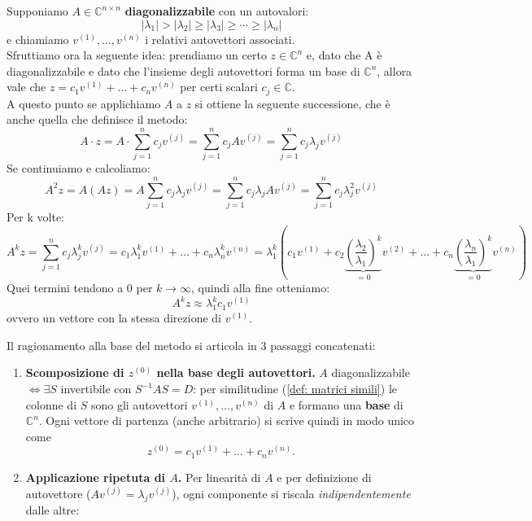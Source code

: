 \documentclass[12pt,a4paper,]{report}
\begin{document}
\begin{metodo}
Supponiamo $A\in \mathbb{C}^{n\times n}$ \textbf{diagonalizzabile} con un autovalori:
\[
|\lambda_1| > |\lambda_2| \geq |\lambda_3| \geq \cdots \geq |\lambda_n|
\]
e chiamiamo $v^{(1)}, \dots, v^{(n)}$ i relativi autovettori associati.\\
Sfruttiamo ora la seguente idea: prendiamo un certo $z\in\mathbb{C}^n$ e, dato che A è diagonalizzabile e dato che l'insieme degli autovettori forma un base di $\mathbb{C}^n$, allora vale che $z = c_1v^{(1)}+\dots+c_nv^{(n)}$ per certi scalari $c_j\in\mathbb{C}$.\\
A questo punto se applichiamo $A$ a $z$ si ottiene la seguente successione, che è anche quella che definisce il metodo:
\[
A \cdot z = A \cdot \sum_{j=1}^{n} c_j v^{(j)} = \sum_{j=1}^{n} c_j A v^{(j)} = \sum_{j=1}^{n} c_j \lambda_j v^{(j)}
\]
Se continuiamo e calcoliamo:
\[
A^2 z = A(Az) = A \sum_{j=1}^{n} c_j \lambda_j v^{(j)} = \sum_{j=1}^{n} c_j \lambda_j A v^{(j)} = \sum_{j=1}^{n} c_j \lambda_j^2 v^{(j)}
\]
Per k volte:
\[
A^k z = \sum_{j=1}^{n} c_j \lambda_j^k v^{(j)} = c_1 \lambda_1^k v^{(1)} + \ldots + c_n \lambda_n^k v^{(n)} = \lambda_1^k \left( c_1 v^{(1)} + c_2 \underbrace{\left(\frac{\lambda_2}{\lambda_1}\right)^k}_{=0} v^{(2)} + \ldots + c_n \underbrace{\left(\frac{\lambda_n}{\lambda_1}\right)^k}_{=0} v^{(n)} \right)
\]
Quei termini tendono a 0 per $k \to \infty$, quindi alla fine otteniamo:
\[
\boxed{A^k z \approx \lambda_1^k c_1 v^{(1)}}
\]
ovvero un vettore con la stessa direzione di $v^{(1)}$.
\begin{nota}
    Il ragionamento alla base del metodo si articola in 3 passaggi concatenati:
    \begin{enumerate}
        \item \textbf{Scomposizione di $z^{(0)}$ nella base degli autovettori.} $A$ diagonalizzabile $\iff \exists S$ invertibile con $S^{-1}AS=D$: per similitudine (\autoref{def: matrici simili}) le colonne di $S$ sono gli autovettori $v^{(1)},\dots,v^{(n)}$ di $A$ e formano una \textbf{base} di $\mathbb{C}^n$. Ogni vettore di partenza (anche arbitrario) si scrive quindi in modo unico come
        \[
        z^{(0)} = c_1v^{(1)}+\dots+c_nv^{(n)}.
        \]
        \item \textbf{Applicazione ripetuta di $A$.} Per linearità di $A$ e per definizione di autovettore ($Av^{(j)}=\lambda_jv^{(j)}$), ogni componente si riscala \textit{indipendentemente} dalle altre:
        \[
\]
\end{enumerate}
\end{nota}
\end{metodo}
\end{document}
